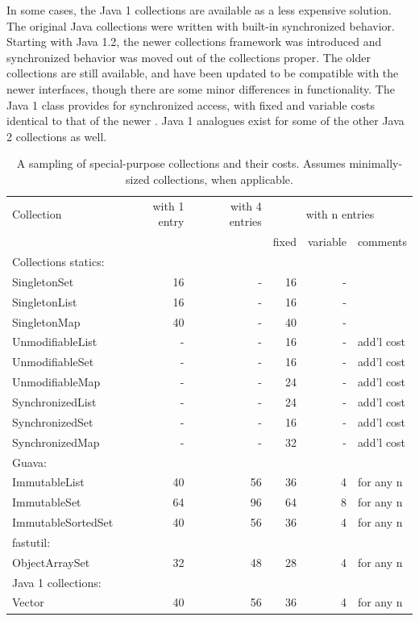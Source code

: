 In some cases, the Java 1 collections are available as a less expensive
solution.  The original Java collections were written
with built-in synchronized behavior. Starting with Java 1.2, the newer
collections framework was introduced and synchronized behavior was moved out of
the collections proper. The older collections are still available,
and have been updated to be compatible with the newer interfaces, though there
are some minor differences in functionality.  The Java 1 
class provides for synchronized access, with fixed and variable costs identical to that of the newer .
Java 1 analogues exist for some of the other Java 2 collections as well.


\begin{table}
\centering
 		\begin{tabular}{l||r||r||rrl}
 		\toprule
	 	 Collection & with 1 entry & with 4 entries &
	 	 \multicolumn{3}{c}{with n entries}\\
	 	 & & & fixed & variable & comments \\
	 	 \midrule
	 	\multicolumn{5}{l}{Collections statics:} \\
	 	\midrule
	 	SingletonSet &  16 & - & 16 & - &  \\
	 	SingletonList & 16 & - & 16 & - &  \\
	 	SingletonMap &  40 & - & 40 & - &  \\
	 	\midrule
	 	UnmodifiableList & - & - & 16 & - & add'l cost \\
	 	UnmodifiableSet & - & - & 16 & - & add'l cost \\
	 	UnmodifiableMap & - & - & 24 & - & add'l cost \\
	 	\midrule
	 	SynchronizedList & - & - & 24  & - & add'l cost \\	 	
	 	SynchronizedSet & - & - & 16  & - & add'l cost \\	 	
	 	SynchronizedMap & - & - & 32  & - & add'l cost \\	 	
	 	\midrule
	 	\multicolumn{5}{l}{Guava:} \\
	 	\midrule
	 	ImmutableList & 40 & 56 & 36 \footnotemark[1] & 4 & for any n \\
	 	ImmutableSet & 64 & 96 & 64 \footnotemark[2] & 8 & for any n \\
	 	ImmutableSortedSet & 40 & 56 & 36 \footnotemark[1] & 4 & for any n \\
	 	 \midrule
	 	\multicolumn{5}{l}{fastutil:} \\
	 	\midrule
	 	ObjectArraySet & 32 & 48 & 28 \footnotemark[1] & 4
	 	& for any n \\
	 	\midrule
	 	\multicolumn{5}{l}{Java 1 collections:} \\
	 	\midrule
	 	Vector & 40 & 56 & 36 \footnotemark[1]  & 4 & for any n\\ 	
	 	\bottomrule
	 	\end{tabular}
	 	
	\caption{A sampling of special-purpose collections and their costs. Assumes
	minimally-sized collections, when applicable.}
	\label{tab:specialized-collections-small}
\end{table}

